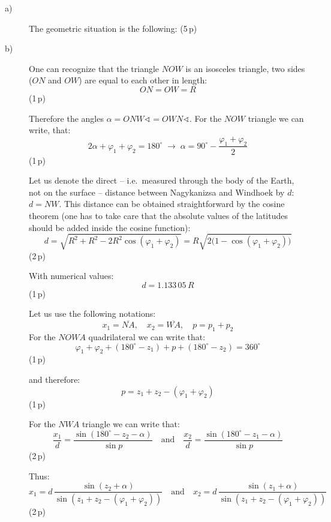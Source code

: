 \begin{description}
\item[a)] The geometric situation is the following: \hfill(5\,p)


\item[b)] One can recognize that the triangle $NOW$ is an isosceles triangle,
  two sides ($ON$ and $OW$) are equal to each other in length:
  \[
    ON = OW = R \tag{12.1}
  \]
  \hfill(1\,p)

  Therefore the angles $\alpha = ONW\sphericalangle = OWN\sphericalangle$. For
  the $NOW$ triangle we can write, that:
  \[
    2\alpha + \varphi_1 + \varphi_2 = 180^\circ
    \;\rightarrow\;
    \alpha = 90^\circ - \frac{\varphi_1 + \varphi_2}{2} \tag{12.2}
  \]
  \hfill(1\,p)

  Let us denote the direct -- i.e.\ measured through the body of the Earth, not
  on the surface -- distance between Nagykanizsa and Windhoek by $d$:
  $d = NW$. This distance can be obtained straightforward by the cosine theorem
  (one has to take care that the absolute values of the latitudes should be
  added inside the cosine function):
  \[
    d = \sqrt{R^2 + R^2 - 2R^2\cos(\varphi_1 + \varphi_2)}
      = R\sqrt{2\bigl(1 - \cos(\varphi_1 + \varphi_2)\bigr)} \tag{12.3}
  \]
  \hfill(2\,p)

  With numerical values:
  \[
    d = 1.133\,05\,R
  \]
  \hfill(1\,p)

  Let us use the following notations:
  \[
    x_1 = \overline{NA}, \quad x_2 = \overline{WA}, \quad p = p_1 + p_2
    \tag{12.4}
  \]
  For the $NOWA$ quadrilateral we can write that:
  \[
    \varphi_1 + \varphi_2 + (180^\circ - z_1) + p + (180^\circ - z_2)
      = 360^\circ \tag{12.5}
  \]
  \hfill(1\,p)

  and therefore:
  \[
    p = z_1 + z_2 - (\varphi_1 + \varphi_2) \tag{12.6}
  \]
  \hfill(1\,p)

  For the $NWA$ triangle we can write that:
  \[
    \frac{x_1}{d} = \frac{\sin(180^\circ - z_2 - \alpha)}{\sin p}
    \quad\text{and}\quad
    \frac{x_2}{d} = \frac{\sin(180^\circ - z_1 - \alpha)}{\sin p} \tag{12.7}
  \]
  \hfill(2\,p)

  Thus:
  \[
    x_1 = d\,\frac{\sin(z_2 + \alpha)}
                  {\sin(z_1 + z_2 - (\varphi_1 + \varphi_2))}
    \quad\text{and}\quad
    x_2 = d\,\frac{\sin(z_1 + \alpha)}
                  {\sin(z_1 + z_2 - (\varphi_1 + \varphi_2))} \tag{12.8}
  \]
  \hfill(2\,p)


\end{description}
